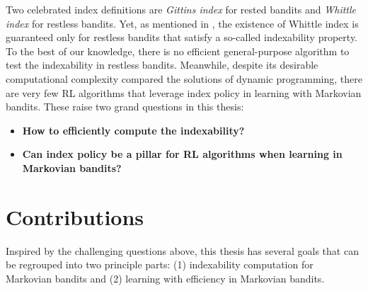 Two celebrated index definitions are \emph{Gittins index} \cite{gittins1979bandit} for rested bandits and \emph{Whittle index} \cite{whittle1988restless} for restless bandits.
Yet, as mentioned in \cite[Chapter~14]{whittle1996optimal}, the existence of Whittle index is guaranteed only for restless bandits that satisfy a so-called indexability property.
To the best of our knowledge, there is no efficient general-purpose algorithm to test the indexability in restless bandits.
Meanwhile, despite its desirable computational complexity compared the solutions of dynamic programming, there are very few RL algorithms that leverage index policy in learning with Markovian bandits.
These raise two grand questions in this thesis:
\begin{itemize}
    \item {\color{myblue}\bfseries\large How to efficiently compute the indexability?}
    \item {\color{myblue}\bfseries\large Can index policy be a pillar for RL algorithms when learning in Markovian bandits?}
\end{itemize}

\section{Contributions}

Inspired by the challenging questions above, this thesis has several goals that can be regrouped into two principle parts: (1) indexability computation for Markovian bandits and (2) learning with efficiency in Markovian bandits.


